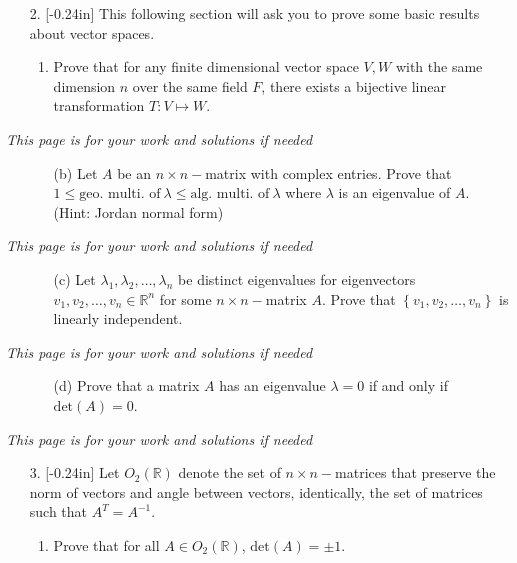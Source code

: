 \documentclass[letterpaper,12pt]{article}
\newcommand{\set}[1]{\left\{ #1 \right\}}
\theoremstyle{definition}
\begin{document}
\pagebreak
\begin{enumerate}
    \item[2. ]\reversemarginpar{}[-0.24in] This following section will ask you to prove some basic results about vector spaces. \begin{enumerate}
        \item Prove that for any finite dimensional vector space $V,W$ with the same dimension $n$ over the same field $F$, there exists a bijective linear transformation $T: V \mapsto W$.
    \end{enumerate}
\end{enumerate}
\pagebreak
\textit{This page is for your work and solutions if needed}
\pagebreak
\begin{itemize}
    \item[] \begin{enumerate}
        \item[(b)]Let $A$ be an $n\times n-$matrix with complex entries. Prove that $1 \leq \text{geo. multi. of} \ \lambda \leq \text{alg. multi. of} \ \lambda$ where $\lambda$ is an eigenvalue of $A$. (Hint: Jordan normal form)
    \end{enumerate}
\end{itemize}
\pagebreak
\textit{This page is for your work and solutions if needed}
\pagebreak
\begin{itemize}
    \item[] \begin{enumerate}
        \item[(c)] Let $\lambda_1,\lambda_2,\ldots,\lambda_n$ be distinct eigenvalues for eigenvectors $v_1,v_2,\ldots,v_n \in \mathbb{R}^n$ for some $n\times n-$matrix $A$. Prove that $\set{v_1,v_2,\ldots,v_n}$ is linearly independent.
    \end{enumerate}
\end{itemize}
\pagebreak
\textit{This page is for your work and solutions if needed}
\pagebreak
\begin{itemize}
    \item[] \begin{enumerate}
        \item[(d)] Prove that a matrix $A$ has an eigenvalue $\lambda = 0$ if and only if $\mathrm{det}(A) = 0$.
    \end{enumerate}
\end{itemize}
\pagebreak
\textit{This page is for your work and solutions if needed}
\pagebreak
\begin{enumerate}
    \item[3.]\reversemarginpar{}[-0.24in] 
    Let $O_2(\mathbb{R})$ denote the set of $n \times n-$matrices that preserve the norm of vectors and angle between vectors, identically, the set of matrices such that $A^T = A^{-1}$. \begin{enumerate}
        \item Prove that for all $A \in O_2(\mathbb{R})$, $\mathrm{det}(A) = \pm 1$.
    \end{enumerate}
\end{enumerate}
\end{document}
